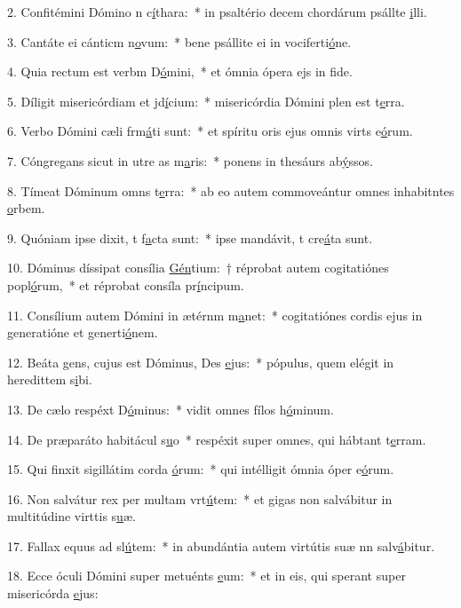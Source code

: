 2. Confitémini Dómino n c\uline{í}thara:~* in psaltério decem chordárum psállte \uline{i}lli.\par 
3. Cantáte ei cánticm n\uline{o}vum:~* bene psállite ei in vociferti\uline{ó}ne.\par 
4. Quia rectum est verbm D\uline{ó}mini,~* et ómnia ópera ejs in f\uline{i}de.\par 
5. Díligit misericórdiam et jd\uline{í}cium:~* misericórdia Dómini plen est t\uline{e}rra.\par 
6. Verbo Dómini cæli frm\uline{á}ti sunt:~* et spíritu oris ejus omnis virts e\uline{ó}rum.\par 
7. Cóngregans sicut in utre as m\uline{a}ris:~* ponens in thesáurs ab\uline{ý}ssos.\par 
8. Tímeat Dóminum omns t\uline{e}rra:~* ab eo autem commoveántur omnes inhabitntes \uline{o}rbem.\par 
9. Quóniam ipse dixit, t f\uline{a}cta sunt:~* ipse mandávit, t cre\uline{á}ta sunt.\par 
10. Dóminus díssipat consília \uline{Gén}tium:~† réprobat autem cogitatiónes popl\uline{ó}rum,~* et réprobat consíla pr\uline{í}ncipum.\par 
11. Consílium autem Dómini in ætérnm m\uline{a}net:~* cogitatiónes cordis ejus in generatióne et generti\uline{ó}nem.\par 
12. Beáta gens, cujus est Dóminus, Des \uline{e}jus:~* pópulus, quem elégit in heredittem s\uline{i}bi.\par 
13. De cælo respéxt D\uline{ó}minus:~* vidit omnes fílos h\uline{ó}minum.\par 
14. De præparáto habitácul s\uline{u}o~* respéxit super omnes, qui hábtant t\uline{e}rram.\par 
15. Qui finxit sigillátim corda \uline{ó}rum:~* qui intélligit ómnia óper e\uline{ó}rum.\par 
16. Non salvátur rex per multam vrt\uline{ú}tem:~* et gigas non salvábitur in multitúdine virttis s\uline{u}æ.\par 
17. Fallax equus ad sl\uline{ú}tem:~* in abundántia autem virtútis suæ nn salv\uline{á}bitur.\par 
18. Ecce óculi Dómini super metuénts \uline{e}um:~* et in eis, qui sperant super misericórda \uline{e}jus:\par 
